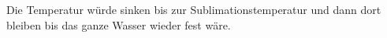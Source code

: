 

\item[e)] Die Temperatur würde sinken bis zur Sublimationstemperatur und dann dort bleiben bis das ganze Wasser wieder fest wäre.